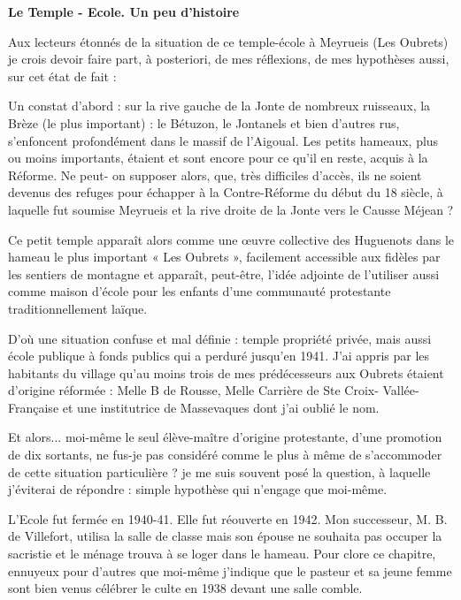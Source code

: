 \textbf{Le Temple - Ecole. Un peu d’histoire}

Aux lecteurs étonnés de la situation de ce temple-école à Meyrueis (Les Oubrets) je
crois devoir faire part, à posteriori, de mes réflexions, de mes hypothèses aussi, sur
cet état de fait :

Un constat d’abord : sur la rive gauche de la Jonte de nombreux ruisseaux, la Brèze
(le plus important) : le Bétuzon, le Jontanels et bien d’autres rus, s’enfoncent
profondément dans le massif de l’Aigoual. Les petits hameaux, plus ou moins
importants, étaient et sont encore pour ce qu’il en reste, acquis à la Réforme. Ne peut-
on supposer alors, que, très difficiles d’accès, ils ne soient devenus des refuges pour
échapper à la Contre-Réforme du début du 18\ieme{} siècle, à laquelle fut soumise
Meyrueis et la rive droite de la Jonte vers le Causse Méjean ?

Ce petit temple apparaît alors comme une œuvre collective des Huguenots dans le
hameau le plus important « Les Oubrets », facilement accessible aux fidèles par les
sentiers de montagne et apparaît, peut-être, l’idée adjointe de l’utiliser aussi
comme maison d’école pour les enfants d’une communauté protestante
traditionnellement laïque.

D’où une situation confuse et mal définie : temple propriété privée, mais aussi école
publique à fonds publics qui a perduré jusqu’en 1941.
J’ai appris par les habitants du village qu’au moins trois de mes prédécesseurs aux
Oubrets étaient d’origine réformée : Melle B de Rousse, Melle Carrière de Ste Croix-
Vallée- Française et une institutrice de Massevaques dont j’ai oublié le nom.

Et alors... moi-même le seul élève-maître d’origine protestante, d’une promotion de
dix sortants, ne fus-je pas considéré comme le plus à même de s’accommoder de cette
situation particulière ? je me suis souvent posé la question, à laquelle j’éviterai de
répondre : simple hypothèse qui n’engage que moi-même.


L’Ecole fut fermée en 1940-41. Elle fut réouverte en 1942. Mon successeur, M. B. de
Villefort, utilisa la salle de classe mais son épouse ne souhaita pas occuper la sacristie
et le ménage trouva à se loger dans le hameau.
Pour clore ce chapitre, ennuyeux pour d’autres que moi-même j’indique que le
pasteur et sa jeune femme sont bien venus célébrer le culte en 1938 devant une salle
comble.

